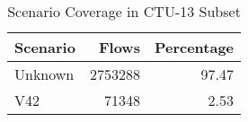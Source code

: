 \begin{table}
\caption{Scenario Coverage in CTU-13 Subset}
\label{tab:scenario_counts}
\begin{tabular}{lrr}
\toprule
Scenario & Flows & Percentage \\
\midrule
Unknown & 2753288 & 97.47 \\
V42 & 71348 & 2.53 \\
\bottomrule
\end{tabular}
\end{table}
